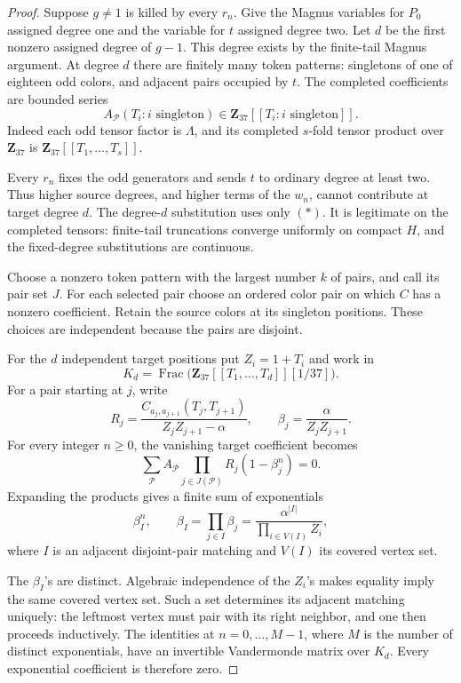 \begin{proof}
Suppose \(g\ne1\) is killed by every \(r_n\).
Give the Magnus variables for \(P_0\) assigned degree one
and the variable for \(t\) assigned degree two.
Let \(d\) be the first nonzero assigned degree of \(g-1\).
This degree exists by the finite-tail Magnus argument.
At degree \(d\) there are finitely many token patterns:
singletons of one of eighteen odd colors, and adjacent
pairs occupied by \(t\). The completed coefficients are
bounded series
\[
 A_{\mathcal P}(T_i:i\text{ singleton})
 \in\mathbf Z_{37}[[T_i:i\text{ singleton}]].
\]
Indeed each odd tensor factor is \(\Lambda\), and its
completed \(s\)-fold tensor product over \(\mathbf Z_{37}\)
is \(\mathbf Z_{37}[[T_1,\ldots,T_s]]\).

Every \(r_n\) fixes the odd generators and sends \(t\) to
ordinary degree at least two. Thus higher source degrees,
and higher terms of the \(w_n\), cannot contribute at
target degree \(d\). The degree-\(d\) substitution uses only
\((*)\). It is legitimate on the completed tensors:
finite-tail truncations converge uniformly on compact
\(H\), and the fixed-degree substitutions are continuous.

Choose a nonzero token pattern with the largest number
\(k\) of pairs, and call its pair set \(J\).
For each selected pair choose an ordered color pair on
which \(C\) has a nonzero coefficient. Retain the source
colors at its singleton positions. These choices are
independent because the pairs are disjoint.

For the \(d\) independent target positions put \(Z_i=1+T_i\)
and work in
\[
 K_d=\operatorname{Frac}
       \bigl(\mathbf Z_{37}[[T_1,\ldots,T_d]][1/37]\bigr).
\]
For a pair starting at \(j\), write
\[
 R_j=\frac{C_{a_j,a_{j+1}}(T_j,T_{j+1})}
              {Z_jZ_{j+1}-\alpha},
 \qquad \beta_j=\frac{\alpha}{Z_jZ_{j+1}}.
\]
For every integer \(n\ge0\), the vanishing target coefficient
becomes
\[
 \sum_{\mathcal P}A_{\mathcal P}
   \prod_{j\in J(\mathcal P)}R_j(1-\beta_j^n)=0.
\]
Expanding the products gives a finite sum of exponentials
\[
 \beta_I^n,\qquad
 \beta_I=\prod_{j\in I}\beta_j
    =\frac{\alpha^{|I|}}{\prod_{i\in V(I)}Z_i},
\]
where \(I\) is an adjacent disjoint-pair matching and
\(V(I)\) its covered vertex set.

The \(\beta_I\)'s are distinct. Algebraic independence of
the \(Z_i\)'s makes equality imply the same covered vertex
set. Such a set determines its adjacent matching uniquely:
the leftmost vertex must pair with its right neighbor,
and one then proceeds inductively. The identities at
\(n=0,\ldots,M-1\), where \(M\) is the number of distinct
exponentials, have an invertible Vandermonde matrix over
\(K_d\). Every exponential coefficient is therefore zero.


\end{proof}
